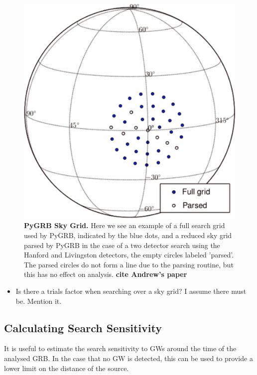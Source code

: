 \documentclass[11pt]{cuthesis}
\begin{document}
\begin{figure} %
\begin{center}
\includegraphics[width=0.6\linewidth]{skypatch.png}
\end{center}
\caption{\textbf{PyGRB Sky Grid.} Here we see an example of a full search grid used by PyGRB, indicated by the blue dots, and a reduced sky grid parsed by PyGRB in the case of a two detector search using the Hanford and Livingston detectors, the empty circles labeled 'parsed'. The parsed circles do not form a line due to the parsing routine, but this has no effect on analysis. \textbf{cite Andrew's paper}}
\label{fig:skypatch}
\end{figure}

\begin{itemize}
\item Is there a trials factor when searching over a sky grid? I assume there must be. Mention it. 
\end{itemize}


\subsection{Calculating Search Sensitivity} \label{sec:pygrb sensitivity}
It is useful to estimate the search sensitivity to GWs around the time of the analysed GRB. In the case that no GW is detected, this can be used to provide a lower limit on the distance of the source.  
\end{document}
